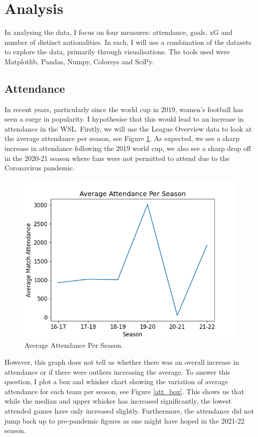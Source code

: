 \documentclass[12pt, a4paper, twocolumn]{article}
\begin{document}
\section{Analysis}

In analysing the data, I focus on four measures: attendance, goals, xG and number of distinct nationalities. In each, I will use a combination of the datasets to explore the data, primarily through visualisations. The tools used were Matplotlib, Pandas, Numpy, Colorsys and SciPy.

\subsection{Attendance}

In recent years, particularly since the world cup in 2019, women's football has seen a surge in popularity. I hypothesise that this would lead to an increase in attendance in the WSL. Firstly, we will use the League Overview data to look at the average attendance per season, see Figure \ref{avg_att}. As expected, we see a sharp increase in attendance following the 2019 world cup, we also see a sharp drop off in the 2020-21 season where fans were not permitted to attend due to the Coronavirus pandemic. 

\begin{figure}
  \includegraphics[width=\linewidth]{../vis/tables/average_attendance.png}
  \caption{Average Attendance Per Season.}
  \label{avg_att}
 \end{figure}

However, this graph does not tell us whether there was an overall increase in attendance or if there were outliers increasing the average. To answer this question, I plot a box and whisker chart showing the variation of average attendance for each team per season, see Figure \ref{att_box}. This shows us that while the median and upper whisker has increased significantly, the lowest attended games have only increased slightly. Furthermore, the attendance did not jump back up to pre-pandemic figures as one might have hoped in the 2021-22 season.
\end{document}
